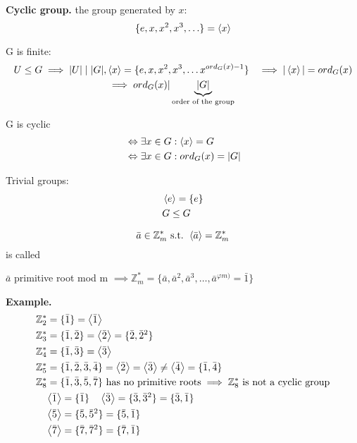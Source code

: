 \textbf{Cyclic group.}
the group generated by $x$:
\[
  \{ e, x, x^2, x^3, \ldots \} = \left\langle x \right\rangle
\]

G is finite:
\begin{align*}
  U \leq  G \implies |U| \mid |G|, 
  & \left\langle x \right\rangle = \{ e, x, x^2, x^3, \ldots x^{ord_G(x) -1}\}
    &\implies |\left\langle x \right\rangle| = ord_G(x) \\
    &\implies ord_G(x) | \underbrace{|G|}_{\text{order of the group}} \\
\end{align*}

G is cyclic
\begin{align*}
  & \Leftrightarrow \exists x \in G: \left\langle x \right\rangle = G \\
  & \Leftrightarrow \exists x \in G: ord_G(x) = |G|
\end{align*}

Trivial groups:
\begin{align*}
  & \left\langle e \right\rangle = \{e\} \\
  & G \leq G
\end{align*}

\begin{definition}
  \[
    \bar{a} \in \mathbb{Z}_m^{*} \text{ s.t. } \left\langle \bar{a} \right\rangle = \mathbb{Z}_m^{*} 
\]
is called 

$\bar{a}$ primitive root mod m 
$\implies \mathbb{Z}_m^{*} = \{\bar{a}, \bar{a}^2, \bar{a}^3, \ldots, \bar{a}^{\varphi{m)}}=\bar{1} \}$
\end{definition}

\textbf{Example.}
\begin{align*}
  &\mathbb{Z}_2^{*} = \{\bar{1}\} = \left\langle \bar{1} \right\rangle \\
  &\mathbb{Z}_3^{*} = \{\bar{1}, \bar{2}\} = \left\langle \bar{2} \right\rangle 
    = \{\bar{2}, \bar{2}^2 \}\\
  &\mathbb{Z}_4^{*} = \{\bar{1}, \bar{3}\} = \left\langle \bar{3} \right\rangle \\
  &\mathbb{Z}_5^{*} = \{\bar{1}, \bar{2}, \bar{3}, \bar{4}\} 
    = \left\langle \bar{2} \right\rangle = \left\langle \bar{3} \right\rangle \neq \left\langle \bar{4} \right\rangle
    = \{\bar{1}, \bar{4}\} \\
  &\mathbb{Z}_8^{*} = \{\bar{1}, \bar{3}, \bar{5}, \bar{7}\} \text{ has no primitive roots} \implies \mathbb{Z}_8^{*}\text{ is not a cyclic group} \\
  & \quad \left\langle \bar{1} \right\rangle = \{\bar{1}\} \quad \left\langle \bar{3} \right\rangle=\{\bar{3}, \bar{3}^2\}=\{\bar{3}, \bar{1}\} \\
  & \quad \left\langle \bar{5} \right\rangle=\{\bar{5}, \bar{5}^2\}=\{\bar{5}, \bar{1}\} \\
  & \quad \left\langle \bar{7} \right\rangle=\{\bar{7}, \bar{7}^2\}=\{\bar{7}, \bar{1}\} \\
\end{align*}

